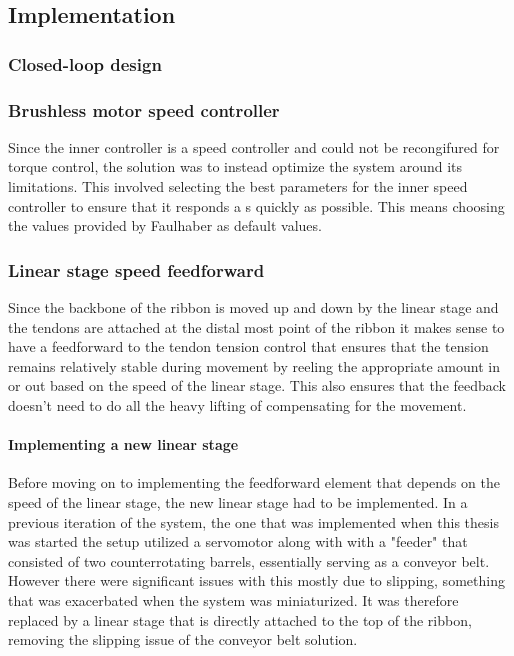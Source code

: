 \subsection{Implementation}


\subsubsection{Closed-loop design}



\subsubsection{Brushless motor speed controller}
Since the inner controller is a speed controller and could not be recongifured for torque control, the solution was to instead optimize the system around its limitations. This involved selecting the best parameters for the inner speed controller to ensure that it responds a s quickly as possible. This means choosing the values provided by Faulhaber as default values. 

\subsubsection{Linear stage speed feedforward}
Since the backbone of the ribbon is moved up and down by the linear stage and the tendons are attached at the distal most point of the ribbon it makes sense to have a feedforward to the tendon tension control that ensures that the tension remains relatively stable during movement by reeling the appropriate amount in or out based on the speed of the linear stage. This also ensures that the feedback doesn't need to do all the heavy lifting of compensating for the movement.

\paragraph*{Implementing a new linear stage}
Before moving on to implementing the feedforward element that depends on the speed of the linear stage, the new linear stage had to be implemented. In a previous iteration of the system, the one that was implemented when this thesis was started the setup utilized a servomotor along with with a "feeder" that consisted of two counterrotating barrels, essentially serving as a conveyor belt. However there were significant issues with this mostly due to slipping, something that was exacerbated when the system was miniaturized. It was therefore replaced by a linear stage that is directly attached to the top of the ribbon, removing the slipping issue of the conveyor belt solution.

